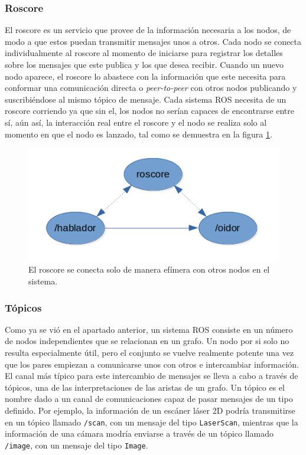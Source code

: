 \subsubsection{Roscore}

El roscore es un servicio que provee de la información necesaria a los nodos, de modo a que estos puedan transmitir mensajes unos a otros. Cada nodo se conecta individualmente al roscore al momento de iniciarse para registrar los detalles sobre los mensajes que este publica y los que desea recibir. Cuando un nuevo nodo aparece, el roscore lo abastece con la información que este necesita para conformar una comunicación directa o \textit{peer-to-peer} con otros nodos publicando y suscribiéndose al mismo tópico de mensaje. Cada sistema ROS necesita de un roscore corriendo ya que sin el, los nodos no serían capaces de encontrarse entre sí, aún así, la interacción real entre el roscore y el nodo se realiza solo al momento en que el nodo es lanzado, tal como se demuestra en la figura \ref{fig:roscoreAndNodes}.

\begin{figure}[ht]
    \centering
    \includegraphics[scale=.6]{./Figures/diagrama_nodos.png}
    \caption{El roscore se conecta solo de manera efímera con otros nodos en el sistema.}
    \label{fig:roscoreAndNodes}
\end{figure}

\subsubsection{Tópicos}

Como ya se vió en el apartado anterior, un sistema ROS consiste en un número de nodos independientes que se relacionan en un grafo. Un nodo por si solo no resulta especialmente útil, pero el conjunto se vuelve realmente potente una vez que los pares empiezan a comunicarse unos con otros e intercambiar información. El canal más típico para este intercambio de mensajes se lleva a cabo a través de tópicos, una de las interpretaciones de las aristas de un grafo. Un tópico es el nombre dado a un canal de comunicaciones capaz de pasar mensajes de un tipo definido. Por ejemplo, la información de un escáner láser 2D podría transmitirse en un tópico llamado \texttt{/scan}, con un mensaje del tipo \texttt{LaserScan}, mientras que la información de una cámara modría enviarse a través de un tópico llamado \texttt{/image}, con un mensaje del tipo \texttt{Image}.


